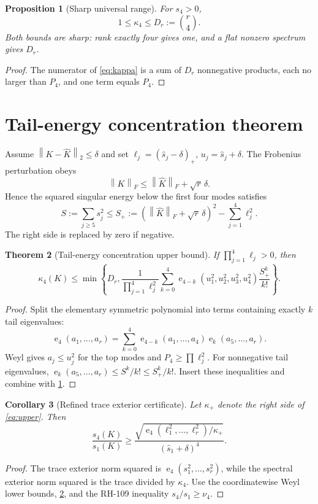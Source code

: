 \documentclass[11pt]{article}
\newtheorem{theorem}{Theorem}[section]\newtheorem{proposition}[theorem]{Proposition}\newtheorem{corollary}[theorem]{Corollary}
\newcommand{\norm}[1]{\left\lVert#1\right\rVert}\newcommand{\e}{\operatorname{e}}
\begin{document}
\begin{proposition}[Sharp universal range]
\label{prop:range}
For $s_4>0$,
\[
 1\le\kappa_4\le D_r:=\binom r4.
\]
Both bounds are sharp: rank exactly four gives one, and a flat nonzero
spectrum gives $D_r$.
\end{proposition}
\begin{proof}
The numerator of \eqref{eq:kappa} is a sum of $D_r$ nonnegative products,
each no larger than $P_4$, and one term equals $P_4$.
\end{proof}

\section{Tail-energy concentration theorem}
Assume $\norm{K-\widehat K}_2\le\delta$ and set
$\ell_j=(\widehat s_j-\delta)_+$, $u_j=\widehat s_j+\delta$.  The Frobenius
perturbation obeys
\[
 \norm{K}_F\le\norm{\widehat K}_F+\sqrt r\,\delta.
\]
Hence the squared singular energy below the first four modes satisfies
\begin{equation}
 S:=\sum_{j\ge5}s_j^2\le S_+:=
 \left(\norm{\widehat K}_F+\sqrt r\,\delta\right)^2-
 \sum_{j=1}^4\ell_j^2.
 \label{eq:tailenergy}
\end{equation}
The right side is replaced by zero if negative.

\begin{theorem}[Tail-energy concentration upper bound]
\label{thm:upper}
If $\prod_{j=1}^4\ell_j>0$, then
\begin{equation}
 \kappa_4(K)\le\min\left\{D_r,
 \frac{1}{\prod_{j=1}^4\ell_j^2}
 \sum_{k=0}^4
 \e_{4-k}(u_1^2,u_2^2,u_3^2,u_4^2)\frac{S_+^k}{k!}
 \right\}.
 \label{eq:upper}
\end{equation}
\end{theorem}
\begin{proof}
Split the elementary symmetric polynomial into terms containing exactly $k$
tail eigenvalues:
\[
 \e_4(a_1,\ldots,a_r)=\sum_{k=0}^4
 \e_{4-k}(a_1,\ldots,a_4)\e_k(a_5,\ldots,a_r).
\]
Weyl gives $a_j\le u_j^2$ for the top modes and
$P_4\ge\prod\ell_j^2$.  For nonnegative tail eigenvalues,
$\e_k(a_5,\ldots,a_r)\le S^k/k!\le S_+^k/k!$.  Insert these inequalities and
combine with \cref{prop:range}.
\end{proof}

\begin{corollary}[Refined trace exterior certificate]
\label{cor:certificate}
Let $\kappa_+$ denote the right side of \eqref{eq:upper}.  Then
\begin{equation}
 \frac{s_4(K)}{s_1(K)}\ge
 \frac{\sqrt{\e_4(\ell_1^2,\ldots,\ell_r^2)/\kappa_+}}
 {(\widehat s_1+\delta)^4}.
 \label{eq:certificate}
\end{equation}
\end{corollary}
\begin{proof}
The trace exterior norm squared is $\e_4(s_1^2,\ldots,s_r^2)$, while the
spectral exterior norm squared is the trace divided by $\kappa_4$.  Use the
coordinatewise Weyl lower bounds, \cref{thm:upper}, and the RH-109 inequality
$s_4/s_1\ge\nu_4$.
\end{proof}
\end{document}
